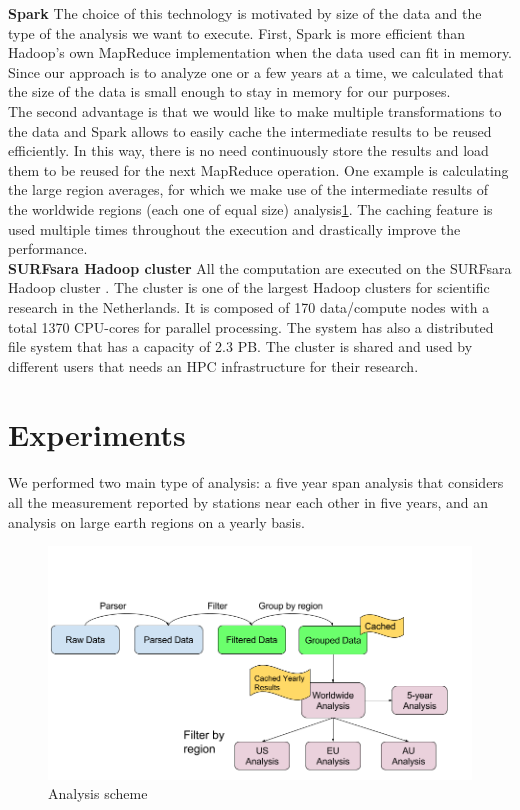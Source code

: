 \documentclass{vldb}
\begin{document}
\textbf{Spark}
The choice of this technology is motivated by size of the data and the type of the analysis we want to execute. First, Spark is more efficient than Hadoop's own MapReduce\cite{dean2008mapreduce} implementation when the data used can fit in memory. Since our approach is to analyze one or a few years at a time, we calculated that the size of the data is small enough to stay in memory for our purposes. \\
The second advantage is that we would like to make multiple transformations to the data and Spark allows to easily cache the intermediate results to be reused efficiently. In this way, there is no need continuously store the results and load them to be reused for the next MapReduce operation. One example is calculating the large region averages, for which we make use of the intermediate results of the worldwide regions (each one of equal size) analysis\ref{fig:analysis}. The caching feature is used multiple times throughout the execution and drastically improve the performance. \\

\textbf{SURFsara Hadoop cluster}
All the computation are executed on the SURFsara Hadoop cluster \cite{surfsara}. The cluster is one of the largest Hadoop clusters for scientific research in the Netherlands. It is composed of 170 data/compute nodes with a total 1370 CPU-cores for parallel processing. The system has also a distributed file system that has a capacity of 2.3 PB. The cluster is shared and used by different users that needs an HPC infrastructure for their research.   

\FloatBarrier

\section{Experiments}
\label{sec:exp}
We performed two main type of analysis: a five year span analysis that considers all the measurement reported by stations near each other in five years, and an analysis on large earth regions on a yearly basis. \\

\begin{figure}[tbh]
\includegraphics[width=1\linewidth]{analysis}
\caption{Analysis scheme}
\label{fig:analysis}
\end{figure}
\end{document}
